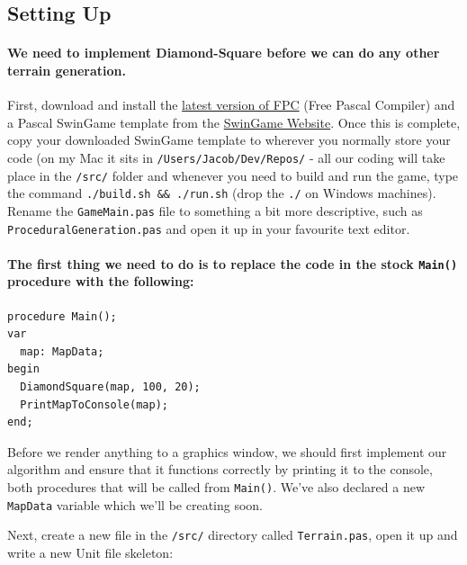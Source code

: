 \documentclass{article}
\begin{document}
\subsection{Setting Up}

\paragraph{We need to implement Diamond-Square before we can do any other terrain generation.}\mbox{}
First, download and install the \href{http://www.freepascal.org/download.var}{latest version of FPC} (Free Pascal Compiler) and a Pascal SwinGame template from the \href{http://swingame.com/index.php/downloads.html}{SwinGame Website}. Once this is complete, copy your downloaded SwinGame template to wherever you normally store your code (on my Mac it sits in \texttt{/Users/Jacob/Dev/Repos/} - all our coding will take place in the \texttt{/src/} folder and whenever you need to build and run the game, type the command \texttt{./build.sh && ./run.sh} (drop the \texttt{./} on Windows machines). Rename the \texttt{GameMain.pas} file to something a bit more descriptive, such as \texttt{ProceduralGeneration.pas} and open it up in your favourite text editor.

\paragraph{The first thing we need to do is to replace the code in the stock \texttt{Main()} procedure with the following:}\mbox{}

\begin{verbatim}
procedure Main();
var
  map: MapData;
begin
  DiamondSquare(map, 100, 20);
  PrintMapToConsole(map);
end;
\end{verbatim}

Before we render anything to a graphics window, we should first implement our algorithm and ensure that it functions correctly by printing it to the console, both procedures that will be called from \texttt{Main()}. We've also declared a new \texttt{MapData} variable which we'll be creating soon.

\vspace{1mm}

Next, create a new file in the \texttt{/src/} directory called \texttt{Terrain.pas}, open it up and write a new Unit file skeleton:
\end{document}
